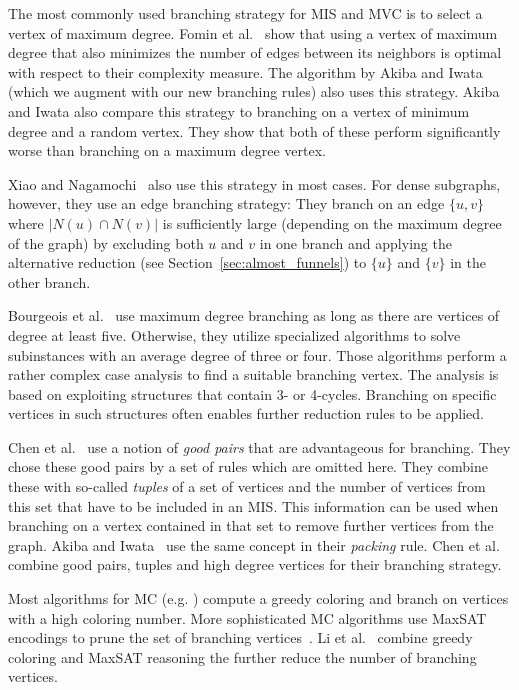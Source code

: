 \documentclass[a4paper,UKenglish,cleveref, autoref, thm-restate]{lipics-v2021}
\begin{document}
The most commonly used branching strategy for MIS and MVC is to select a vertex
of maximum degree. Fomin et al.~\cite{Fomin} show that using a vertex of maximum
degree that also minimizes the number of edges between its neighbors is optimal
with respect to their complexity measure. The algorithm by Akiba and Iwata~\cite{AkibaIwata}
(which we augment with our new branching rules) also uses this strategy. Akiba and Iwata also
compare this strategy to branching on a vertex of minimum degree and a random
vertex. They show that both of these perform significantly worse than branching
on a maximum degree vertex.

Xiao and Nagamochi~\cite{XiaoNagamochi} also use
this strategy in most cases. For dense subgraphs, however, they use an edge
branching strategy: They branch on an edge $\{u, v\}$ where $|N(u) \cap N(v)|$
is sufficiently large (depending on the maximum degree of the graph) by
excluding both $u$ and $v$ in one branch and applying the alternative reduction
(see Section~\ref{sec:almost_funnels}) to $\{u\}$ and $\{v\}$ in the other branch.

Bourgeois et al.~\cite{Bourgeois} use maximum degree branching as long as there are vertices of degree at least five. Otherwise, they utilize specialized algorithms to solve subinstances with an average degree of three or four. Those algorithms perform a rather complex case analysis to find a suitable branching vertex. The analysis is based on exploiting structures that contain 3- or 4-cycles. Branching on specific vertices in such structures often enables further reduction rules to be applied.

Chen et al.~\cite{ChenXiaKanj} use a notion of \emph{good pairs} that are advantageous
for branching. They chose these good pairs by a set of rules which are omitted
here. They combine these with so-called \emph{tuples} of a set of vertices and the
number of vertices from this set that have to be included in an MIS. This
information can be used when branching on a vertex
contained in that set to remove further vertices from the graph. Akiba and
Iwata~\cite{AkibaIwata} use the same concept in their \emph{packing} rule. Chen
et al. combine good pairs, tuples and high degree vertices for their branching strategy.

Most algorithms for MC (e.g. \cite{Color,DBLP:journals/ieicet/TomitaSHW13}) compute a
greedy coloring and branch on vertices with a high coloring number.
More sophisticated MC algorithms use MaxSAT encodings to prune the set of
branching vertices~\cite{LiFangXu,LiJiang,LiQuan}. Li et al.~\cite{LiMaxSat}
combine greedy coloring and MaxSAT reasoning the further reduce the number of
branching vertices.
\end{document}
